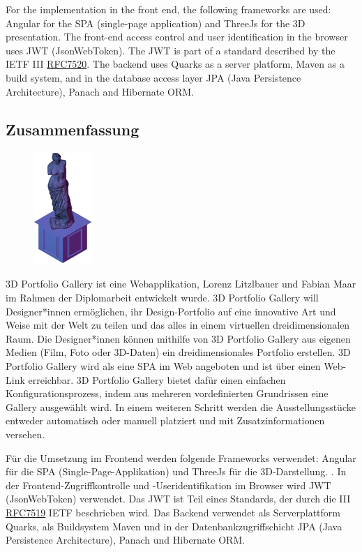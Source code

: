 For the implementation in the front end, the following frameworks are used: Angular for the SPA (single-page application) and ThreeJs for the 3D presentation. The front-end access control and user identification in the browser uses JWT (JsonWebToken). The JWT is part of a standard described by the IETF III \href{https://www.rfc-editor.org/ rfc/rFc7519}{RFC7520}.
The backend uses Quarks as a server platform, Maven as a build system, and in the database access layer JPA (Java Persistence Architecture), Panach and Hibernate ORM.
\newpage
\begin{spacing}{1}
    \chapter*{Zusammenfassung}
\end{spacing}
\begin{figure}
    \begin{center}
      \includegraphics[width=0.2\textwidth]{pics/statue.png}
    \end{center}
\end{figure}
3D Portfolio Gallery ist eine Webapplikation, Lorenz Litzlbauer und Fabian Maar im Rahmen der Diplomarbeit entwickelt wurde. 3D Portfolio Gallery will Designer*innen ermöglichen, ihr Design-Portfolio auf eine innovative Art und Weise mit der Welt zu teilen und das alles in einem virtuellen dreidimensionalen Raum. Die Designer*innen können mithilfe von 3D Portfolio Gallery aus eigenen Medien (Film, Foto oder 3D-Daten) ein dreidimensionales Portfolio erstellen.
3D Portfolio Gallery wird als eine SPA im Web angeboten und ist über einen Web-Link erreichbar.
3D Portfolio Gallery bietet dafür einen einfachen Konfigurationsprozess, indem aus mehreren vordefinierten Grundrissen eine Gallery ausgewählt wird. In einem weiteren Schritt werden die Ausstellungsstücke entweder automatisch oder manuell platziert und mit Zusatzinformationen versehen.


Für die Umsetzung im Frontend werden folgende Frameworks verwendet: Angular für die SPA (Single-Page-Applikation) und ThreeJs für die 3D-Darstellung. . In der Frontend-Zugriffkontrolle und -Useridentifikation im Browser wird JWT (JsonWebToken) verwendet. Das JWT ist Teil eines Standards, der durch die III \href{https://www.rfc-editor.org/rfc/rfc7519}{RFC7519} IETF beschrieben wird.
Das Backend verwendet als Serverplattform Quarks, als Buildsystem Maven und in der Datenbankzugriffschicht JPA (Java Persistence Architecture), Panach und Hibernate ORM.
